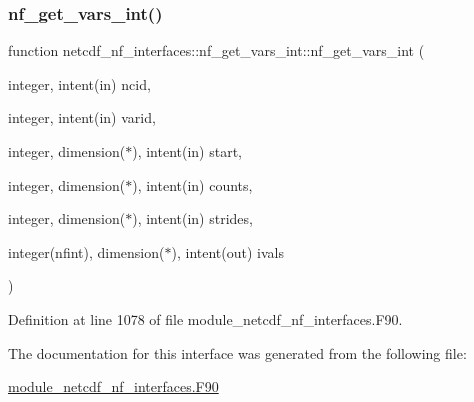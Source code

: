\subsubsection{\texorpdfstring{nf\+\_\+get\+\_\+vars\+\_\+int()}{nf\_get\_vars\_int()}}
{\footnotesize\ttfamily function netcdf\+\_\+nf\+\_\+interfaces\+::nf\+\_\+get\+\_\+vars\+\_\+int\+::nf\+\_\+get\+\_\+vars\+\_\+int (\begin{DoxyParamCaption}\item[{integer, intent(in)}]{ncid,  }\item[{integer, intent(in)}]{varid,  }\item[{integer, dimension($\ast$), intent(in)}]{start,  }\item[{integer, dimension($\ast$), intent(in)}]{counts,  }\item[{integer, dimension($\ast$), intent(in)}]{strides,  }\item[{integer(nfint), dimension($\ast$), intent(out)}]{ivals }\end{DoxyParamCaption})}



Definition at line 1078 of file module\+\_\+netcdf\+\_\+nf\+\_\+interfaces.\+F90.



The documentation for this interface was generated from the following file\+:\begin{DoxyCompactItemize}
\item 
\hyperlink{module__netcdf__nf__interfaces_8F90}{module\+\_\+netcdf\+\_\+nf\+\_\+interfaces.\+F90}\end{DoxyCompactItemize}
